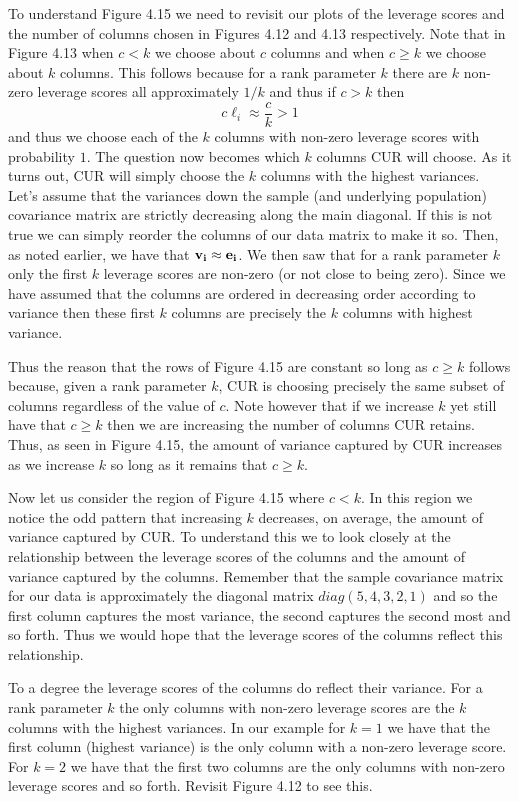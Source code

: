 \documentclass{book}
\begin{document}
To understand Figure 4.15 we need to revisit our plots of the leverage scores and the number of columns chosen in Figures 4.12 and 4.13 respectively. Note that in Figure 4.13 when $c<k$ we choose about $c$ columns and when $c \geq k$ we choose about $k$ columns. This follows because for a rank parameter $k$ there are $k$ non-zero leverage scores all approximately $1/k$ and thus if $c>k$ then
$$
c\ell_i\approx\frac{c}{k}>1
$$
and thus we choose each of the $k$ columns with non-zero leverage scores with probability $1$. The question now becomes which $k$ columns CUR will choose. As it turns out, CUR will simply choose the $k$ columns with the highest variances. Let's assume that the variances down the sample (and underlying population) covariance matrix are strictly decreasing along the main diagonal. If this is not true we can simply reorder the columns of our data matrix to make it so. Then, as noted earlier, we have that ${\bf v_i}\approx {\bf e_i}$. We then saw that for a rank parameter $k$ only the first $k$ leverage scores are non-zero (or not close to being zero). Since we have assumed that the columns are ordered in decreasing order according to variance then these first $k$ columns are precisely the $k$ columns with highest variance. 

Thus the reason that the rows of Figure 4.15 are constant so long as $c \geq k$ follows because, given a rank parameter $k$, CUR is choosing precisely the same subset of columns regardless of the value of $c$. Note however that if we increase $k$ yet still have that $c \geq k$ then we are increasing the number of columns CUR retains. Thus, as seen in Figure 4.15, the amount of variance captured by CUR increases as we increase $k$ so long as it remains that $c \geq k$. 

Now let us consider the region of Figure 4.15 where $c<k$. In this region we notice the odd pattern that increasing $k$ decreases, on average, the amount of variance captured by CUR. To understand this we to look closely at the relationship between the leverage scores of the columns and the amount of variance captured by the columns. Remember that the sample covariance matrix for our data is approximately the diagonal matrix $diag(5,4,3,2,1)$ and so the first column captures the most variance, the second captures the second most and so forth. Thus we would hope that the leverage scores of the columns reflect this relationship. 

To a degree the leverage scores of the columns do reflect their variance. For a rank parameter $k$ the only columns with non-zero leverage scores are the $k$ columns with the highest variances. In our example for $k=1$ we have that the first column (highest variance) is the only column with a non-zero leverage score. For $k=2$ we have that the first two columns are the only columns with non-zero leverage scores and so forth. Revisit Figure 4.12 to see this. 
\end{document}

